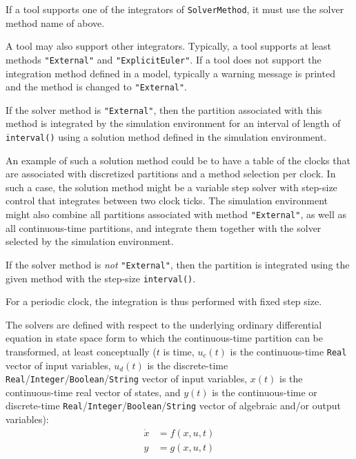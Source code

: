If a tool supports one of the integrators of \lstinline!SolverMethod!, it must use the solver method name of above.

\begin{nonnormative}
A tool may also support other integrators.
Typically, a tool supports at least methods \lstinline!"External"! and \lstinline!"ExplicitEuler"!.
If a tool does not support the integration method defined in a model, typically a warning message is printed and the method is changed to \lstinline!"External"!.
\end{nonnormative}

If the solver method is \lstinline!"External"!, then the partition associated with this method is integrated by the simulation environment for an interval of length of
\lstinline!interval()! using a solution method defined in the simulation environment.

\begin{nonnormative}
An example of such a solution method could be to have a table of the clocks that are associated with discretized partitions and a method selection per clock.
In such a case, the solution method might be a variable step solver with step-size control that integrates between two clock ticks.
The simulation environment might also combine all partitions associated with method \lstinline!"External"!, as well as all continuous-time partitions, and integrate them together with the solver selected by the simulation environment.
\end{nonnormative}

If the solver method is \emph{not} \lstinline!"External"!, then the partition is
integrated using the given method with the step-size \lstinline!interval()!.

\begin{nonnormative}
For a periodic clock, the integration is thus performed with fixed step size.
\end{nonnormative}

The solvers are defined with respect to the underlying ordinary
differential equation in state space form to which the continuous-time
partition can be transformed, at least conceptually ($t$ is time,
$u_{c}(t)$ is the continuous-time \lstinline!Real! vector
of input variables, $u_{d}(t)$ is the
discrete-time \lstinline!Real!/\lstinline!Integer!/\lstinline!Boolean!/\lstinline!String! vector of input variables,
$x(t)$ is the continuous-time real vector of states, and
$y(t)$ is the continuous-time or discrete-time
\lstinline!Real!/\lstinline!Integer!/\lstinline!Boolean!/\lstinline!String! vector of algebraic and/or output variables):
\begin{align*}
\dot{x} &= f(x, u, t)\\
y &= g(x, u, t)
\end{align*}

